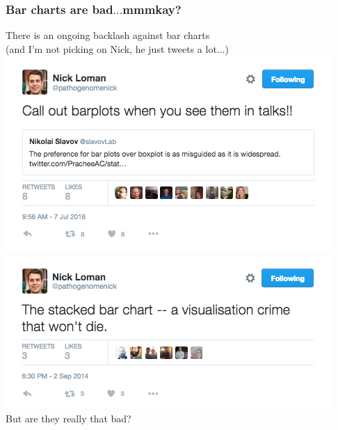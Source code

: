 
\begin{frame}
  \frametitle{Bar charts are bad$\ldots$mmmkay?}
  \textcolor{hutton_green}{There is an ongoing backlash against bar charts} \\
  (and I'm not picking on Nick, he just tweets a lot$\ldots$)
  \includegraphics[height=0.3\textheight]{images/tweet_barchart}
  \includegraphics[height=0.3\textheight]{images/tweet_stackedbar} \\
  \textcolor{hutton_blue}{But are they really that bad?}
\end{frame}

